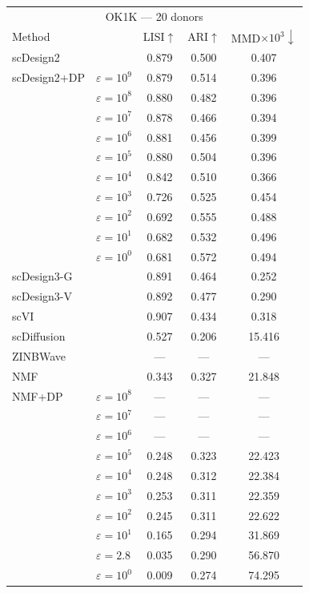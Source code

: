 \begin{tabular}{llccc}
\toprule
\multicolumn{5}{c}{OK1K — 20 donors} \\
Method & & LISI$\uparrow$ & ARI$\uparrow$ & MMD$\times 10^3\downarrow$ \\
\midrule
scDesign2 &  & 0.879 & 0.500 & 0.407 \\
scDesign2+DP & $\varepsilon=10^{9}$ & 0.879 & 0.514 & 0.396 \\
 & $\varepsilon=10^{8}$ & 0.880 & 0.482 & 0.396 \\
 & $\varepsilon=10^{7}$ & 0.878 & 0.466 & 0.394 \\
 & $\varepsilon=10^{6}$ & 0.881 & 0.456 & 0.399 \\
 & $\varepsilon=10^{5}$ & 0.880 & 0.504 & 0.396 \\
 & $\varepsilon=10^{4}$ & 0.842 & 0.510 & 0.366 \\
 & $\varepsilon=10^{3}$ & 0.726 & 0.525 & 0.454 \\
 & $\varepsilon=10^{2}$ & 0.692 & 0.555 & 0.488 \\
 & $\varepsilon=10^{1}$ & 0.682 & 0.532 & 0.496 \\
 & $\varepsilon=10^{0}$ & 0.681 & 0.572 & 0.494 \\
\addlinespace[2pt]
scDesign3-G &  & 0.891 & 0.464 & 0.252 \\
\addlinespace[2pt]
scDesign3-V &  & 0.892 & 0.477 & 0.290 \\
\addlinespace[2pt]
scVI &  & 0.907 & 0.434 & 0.318 \\
\addlinespace[2pt]
scDiffusion &  & 0.527 & 0.206 & 15.416 \\
\addlinespace[2pt]
ZINBWave &  & --- & --- & --- \\
\addlinespace[2pt]
NMF &  & 0.343 & 0.327 & 21.848 \\
\addlinespace[2pt]
NMF+DP & $\varepsilon=10^{8}$ & --- & --- & --- \\
 & $\varepsilon=10^{7}$ & --- & --- & --- \\
 & $\varepsilon=10^{6}$ & --- & --- & --- \\
 & $\varepsilon=10^{5}$ & 0.248 & 0.323 & 22.423 \\
 & $\varepsilon=10^{4}$ & 0.248 & 0.312 & 22.384 \\
 & $\varepsilon=10^{3}$ & 0.253 & 0.311 & 22.359 \\
 & $\varepsilon=10^{2}$ & 0.245 & 0.311 & 22.622 \\
 & $\varepsilon=10^{1}$ & 0.165 & 0.294 & 31.869 \\
 & $\varepsilon=2.8$ & 0.035 & 0.290 & 56.870 \\
 & $\varepsilon=10^{0}$ & 0.009 & 0.274 & 74.295 \\
\bottomrule
\end{tabular}


